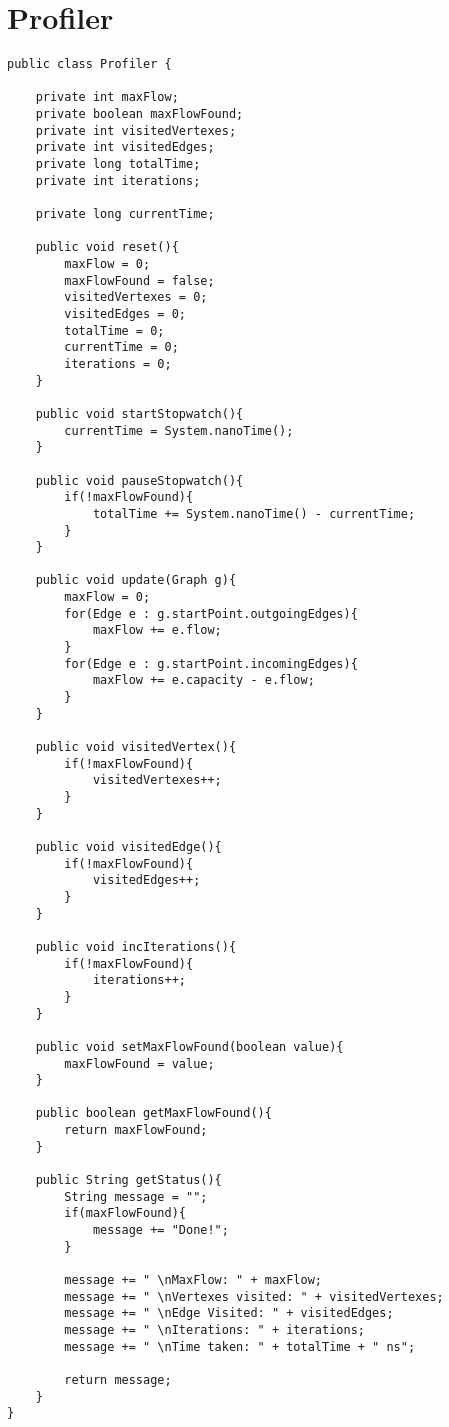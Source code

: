\chapter{Profiler}
\lstset{language=Java}
\begin{lstlisting}[caption=Profiler Source Code]
public class Profiler {

	private int maxFlow;
	private boolean maxFlowFound;
	private int visitedVertexes;
	private int visitedEdges;
	private long totalTime;
	private int iterations;
	
	private long currentTime;
	
	public void reset(){
		maxFlow = 0;
		maxFlowFound = false;
		visitedVertexes = 0;
		visitedEdges = 0;
		totalTime = 0;
		currentTime = 0;
		iterations = 0;
	}
	
	public void startStopwatch(){
		currentTime = System.nanoTime();
	}
	
	public void pauseStopwatch(){
		if(!maxFlowFound){
			totalTime += System.nanoTime() - currentTime;
		}
	}
	
	public void update(Graph g){
		maxFlow = 0;
		for(Edge e : g.startPoint.outgoingEdges){
			maxFlow += e.flow;
		}
		for(Edge e : g.startPoint.incomingEdges){
			maxFlow += e.capacity - e.flow;
		}
	}
	
	public void visitedVertex(){
		if(!maxFlowFound){
			visitedVertexes++;
		}
	}
	
	public void visitedEdge(){
		if(!maxFlowFound){
			visitedEdges++;
		}
	}
	
	public void incIterations(){
		if(!maxFlowFound){
			iterations++;
		}
	}
	
	public void setMaxFlowFound(boolean value){
		maxFlowFound = value;
	}
	
	public boolean getMaxFlowFound(){
		return maxFlowFound;
	}
	
	public String getStatus(){
		String message = "";
		if(maxFlowFound){
			message += "Done!";
		}
		
		message += " \nMaxFlow: " + maxFlow;
		message += " \nVertexes visited: " + visitedVertexes;
		message += " \nEdge Visited: " + visitedEdges;
		message += " \nIterations: " + iterations;
		message += " \nTime taken: " + totalTime + " ns";
				
		return message;
	}
}
\end{lstlisting}